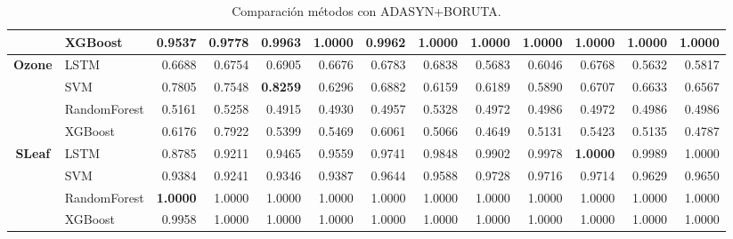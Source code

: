 \begin{table}[h]
\begin{adjustbox}{max width=15cm}
\begin{tabular}{|c|l|r|r|r|r|r|r|r|r|r|r|r|}
		& XGBoost &  0.9537 &  0.9778 &  0.9963 &  1.0000 &  0.9962 &  1.0000 &  1.0000 &  1.0000 &  1.0000 &  1.0000 &  1.0000 \\
		\hline
		\textbf{Ozone} & LSTM &  0.6688 &  0.6754 &  0.6905 &  0.6676 &  0.6783 &  0.6838 &  0.5683 &  0.6046 &  0.6768 &  0.5632 &  0.5817 \\
		& SVM &  0.7805 &  0.7548 &  \textbf{0.8259} &  0.6296 &  0.6882 &  0.6159 &  0.6189 &  0.5890 &  0.6707 &  0.6633 &  0.6567 \\
		& RandomForest &  0.5161 &  0.5258 &  0.4915 &  0.4930 &  0.4957 &  0.5328 &  0.4972 &  0.4986 &  0.4972 &  0.4986 &  0.4986 \\
		& XGBoost &  0.6176 &  0.7922 &  0.5399 &  0.5469 &  0.6061 &  0.5066 &  0.4649 &  0.5131 &  0.5423 &  0.5135 &  0.4787 \\
		\hline
		\textbf{SLeaf} & LSTM &  0.8785 &  0.9211 &  0.9465 &  0.9559 &  0.9741 &  0.9848 &  0.9902 &  0.9978 &  \textbf{1.0000} &  0.9989 &  1.0000 \\
		& SVM &  0.9384 &  0.9241 &  0.9346 &  0.9387 &  0.9644 &  0.9588 &  0.9728 &  0.9716 &  0.9714 &  0.9629 &  0.9650 \\
		& RandomForest &  \textbf{1.0000} &  1.0000 &  1.0000 &  1.0000 &  1.0000 &  1.0000 &  1.0000 &  1.0000 &  1.0000 &  1.0000 &  1.0000 \\
		& XGBoost &  0.9958 &  1.0000 &  1.0000 &  1.0000 &  1.0000 &  1.0000 &  1.0000 &  1.0000 &  1.0000 &  1.0000 &  1.0000 \\
		\hline
\end{tabular}
\end{adjustbox}
\caption{Comparación métodos con ADASYN+BORUTA.}
\label{tab:all_comp_adasyn_boruta}
\end{table}



